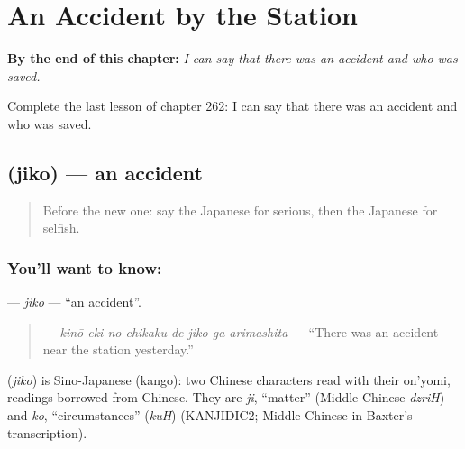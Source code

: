 
\chapter{An Accident by the Station}
\label{ch:ja-an-accident-by-the-station}

\begin{chapteropening}
\textbf{By the end of this chapter:} \emph{I can say that there was an accident and who was saved.}

Complete the last lesson of chapter 262: I can say that there was an accident and who was saved.
\end{chapteropening}

\section[\texorpdfstring{\ja{じこ} (jiko)}{じこ (jiko)}]{ (jiko) — an accident}

\label{lesson:JA-C262-jiko}



\begin{quote}
Before the new one: say the Japanese for serious, then the Japanese for selfish.
\end{quote}

\subsection*{You'll want to know: }
\textbf{} — \emph{jiko} — \textquotedblleft{}an accident\textquotedblright{}.

\begin{quote}
\textbf{    } — \emph{kinō eki no chikaku de jiko ga arimashita} — \textquotedblleft{}There was an accident near the station yesterday.\textquotedblright{}
\end{quote}

\begin{cousinweb}
\textbf{} (\emph{jiko}) is Sino-Japanese (kango): two Chinese characters read with their on'yomi, readings borrowed from Chinese. They are \emph{ji}, \textquotedblleft{}matter\textquotedblright{} (Middle Chinese \emph{dzriH}) and \emph{ko}, \textquotedblleft{}circumstances\textquotedblright{} (\emph{kuH}) (KANJIDIC2; Middle Chinese in Baxter's transcription).
\end{cousinweb}

